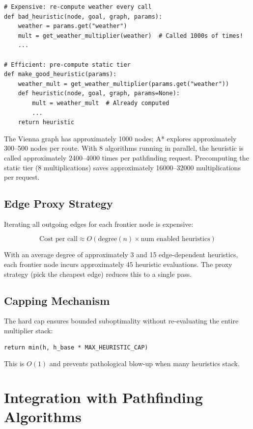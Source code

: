 \documentclass[12pt,a4paper]{article}
\begin{document}
\begin{lstlisting}
# Expensive: re-compute weather every call
def bad_heuristic(node, goal, graph, params):
    weather = params.get("weather")
    mult = get_weather_multiplier(weather)  # Called 1000s of times!
    ...

# Efficient: pre-compute static tier
def make_good_heuristic(params):
    weather_mult = get_weather_multiplier(params.get("weather"))
    def heuristic(node, goal, graph, params=None):
        mult = weather_mult  # Already computed
        ...
    return heuristic
\end{lstlisting}

The Vienna graph has approximately 1000 nodes; A* explores approximately 300--500 nodes per route. With 8 algorithms running in parallel, the heuristic is called approximately 2400--4000 times per pathfinding request. Precomputing the static tier (8 multiplications) saves approximately 16000--32000 multiplications per request.

\subsection{Edge Proxy Strategy}

Iterating all outgoing edges for each frontier node is expensive:

\[
\text{Cost per call} \approx O(\text{degree}(n) \times \text{num enabled heuristics})
\]

With an average degree of approximately 3 and 15 edge-dependent heuristics, each frontier node incurs approximately 45 heuristic evaluations. The proxy strategy (pick the cheapest edge) reduces this to a single pass.

\subsection{Capping Mechanism}

The hard cap ensures bounded suboptimality without re-evaluating the entire multiplier stack:

\begin{lstlisting}
return min(h, h_base * MAX_HEURISTIC_CAP)
\end{lstlisting}

This is $O(1)$ and prevents pathological blow-up when many heuristics stack.

\newpage

\section{Integration with Pathfinding Algorithms}
\end{document}
